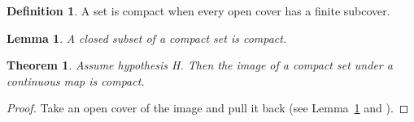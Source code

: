\documentclass{article}
\newtheorem{theorem}{Theorem}
\newtheorem{lemma}{Lemma}
\theoremstyle{definition}
\newtheorem{definition}{Definition}
\begin{document}
\begin{definition}\label{def:compact}
A set is compact when every open cover has a finite subcover.
\end{definition}

\begin{lemma}\label{lem:closed}
A closed subset of a compact set is compact.
\end{lemma}

\begin{theorem}\label{thm:main}
Assume hypothesis H. Then the image of a compact set under a continuous map is compact.
\end{theorem}

\begin{proof}
Take an open cover of the image and pull it back (see Lemma~\ref{lem:closed} and \cite{rudin}).
\end{proof}



\end{document}
